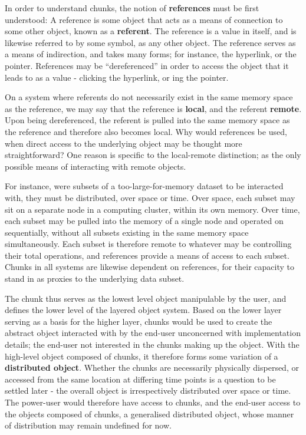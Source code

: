 In order to understand chunks, the notion of \textbf{references} must be first understood: A reference is some object that acts as a means of connection to some other object, known as a \textbf{referent}.
The reference is a value in itself, and is likewise referred to by some symbol, as any other object.
The reference serves as a means of indirection, and takes many forms; for instance, the hyperlink, or the pointer.
References may be ``dereferenced'' in order to access the object that it leads to as a value - clicking the hyperlink, or ing the pointer.

On a system where referents do not necessarily exist in the same memory space as the reference, we may say that the reference is \textbf{local}, and the referent \textbf{remote}.
Upon being dereferenced, the referent is pulled into the same memory space as the reference and therefore also becomes local.
Why would references be used, when direct access to the underlying object may be thought more straightforward?
One reason is specific to the local-remote distinction; as the only possible means of interacting with remote objects.

For instance, were subsets of a too-large-for-memory dataset to be interacted with, they must be distributed, over space or time.
Over space, each subset may sit on a separate node in a computing cluster, within its own memory.
Over time, each subset may be pulled into the memory of a single node and operated on sequentially, without all subsets existing in the same memory space simultaneously.
Each subset is therefore remote to whatever may be controlling their total operations, and references provide a means of access to each subset.
Chunks in all systems are likewise dependent on references, for their capacity to stand in as proxies to the underlying data subset.

The chunk thus serves as the lowest level object manipulable by the user, and defines the lower level of the layered object system.
Based on the lower layer serving as a basis for the higher layer, chunks would be used to create the abstract object interacted with by the end-user unconcerned with implementation details; the end-user not interested in the chunks making up the object.
With the high-level object composed of chunks, it therefore forms some variation of a \textbf{distributed object}.
Whether the chunks are necessarily physically dispersed, or accessed from the same location at differing time points is a question to be settled later - the overall object is irrespectively distributed over space or time.
The power-user would therefore have access to chunks, and the end-user access to the objects composed of chunks, a generalised distributed object, whose manner of distribution may remain undefined for now.

